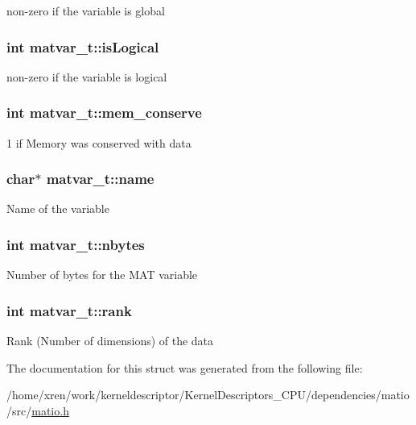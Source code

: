 \label{structmatvar__t_af26c71c4c0ddb14931d15910dddac1bc}
non-\/zero if the variable is global \hypertarget{structmatvar__t_a866c1539e68073a837833d74cd4a65be}{
\subsubsection[{isLogical}]{\setlength{\rightskip}{0pt plus 5cm}int {\bf matvar\_\-t::isLogical}}}
\label{structmatvar__t_a866c1539e68073a837833d74cd4a65be}
non-\/zero if the variable is logical \hypertarget{structmatvar__t_aff20e87a00691c97340ab07656a13ee7}{
\subsubsection[{mem\_\-conserve}]{\setlength{\rightskip}{0pt plus 5cm}int {\bf matvar\_\-t::mem\_\-conserve}}}
\label{structmatvar__t_aff20e87a00691c97340ab07656a13ee7}
1 if Memory was conserved with data \hypertarget{structmatvar__t_a5f03073a500dae5824d0c7895ae60df9}{
\subsubsection[{name}]{\setlength{\rightskip}{0pt plus 5cm}char$\ast$ {\bf matvar\_\-t::name}}}
\label{structmatvar__t_a5f03073a500dae5824d0c7895ae60df9}
Name of the variable \hypertarget{structmatvar__t_ae6e0987fef1e35a7e4d0a78b27648035}{
\subsubsection[{nbytes}]{\setlength{\rightskip}{0pt plus 5cm}int {\bf matvar\_\-t::nbytes}}}
\label{structmatvar__t_ae6e0987fef1e35a7e4d0a78b27648035}
Number of bytes for the MAT variable \hypertarget{structmatvar__t_a84ba70c96ded13cc555fa75b768d9921}{
\subsubsection[{rank}]{\setlength{\rightskip}{0pt plus 5cm}int {\bf matvar\_\-t::rank}}}
\label{structmatvar__t_a84ba70c96ded13cc555fa75b768d9921}
Rank (Number of dimensions) of the data 

The documentation for this struct was generated from the following file:\begin{DoxyCompactItemize}
\item 
/home/xren/work/kerneldescriptor/KernelDescriptors\_\-CPU/dependencies/matio/src/\hyperlink{matio_8h}{matio.h}\end{DoxyCompactItemize}
